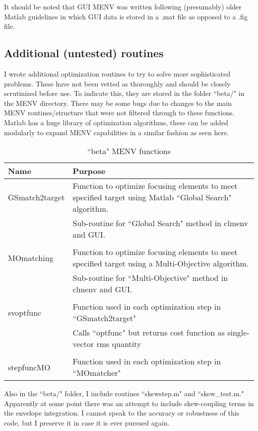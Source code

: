 \documentclass[../menv_main.tex]{subfiles}
\begin{document}
It should be noted that GUI MENV was written following (presumably) older Matlab guidelines in which GUI data is stored in a .mat file as opposed to a .fig file.

\subsection{Additional (untested) routines}
I wrote additional optimization routines to try to solve more sophisticated problems. These have not been vetted as thoroughly and should be closely scrutinized before use. To indicate this, they are stored in the folder ``beta/" in the MENV directory. There may be some bugs due to changes to the main MENV routines/structure that were not filtered through to these functions. Matlab has a huge library of optimization algorithms, these can be added modularly to expand MENV capabilities in a similar fashion as seen here.

\begin{table}[htb]
\centering
\caption{``beta" MENV functions}
\label{tab:menv-beta}
\vspace{10pt}
\begin{tabularx}{\textwidth}{l X}
\hline
 Name & Purpose \\
\hline
GSmatch2target& Function to optimize focusing elements to meet specified target using Matlab ``Global Search" algorithm. \\
			& Sub-routine for ``Global Search" method in clmenv and GUI. \\ &\\
MOmatching	& Function to optimize focusing elements to meet specified target using a Multi-Objective algorithm.\\
			& Sub-routine for ``Multi-Objective" method in clmenv and GUI. \\&\\
svoptfunc 	& Function used in each optimization step in ``GSmatch2target" \\
			& Calls ``optfunc" but returns cost function as single-vector rms quantity \\&\\
stepfuncMO 	& Function used in each optimization step in ``MOmatcher" \\
\hline
\end{tabularx}
\end{table}

Also in the ``beta/" folder, I include routines ``skewstep.m" and ``skew\_test.m." Apparently at some point there was an attempt to include skew-coupling terms in the envelope integration. I cannot speak to the accuracy or robustness of this code, but I preserve it in case it is ever pursued again. 
\end{document}
